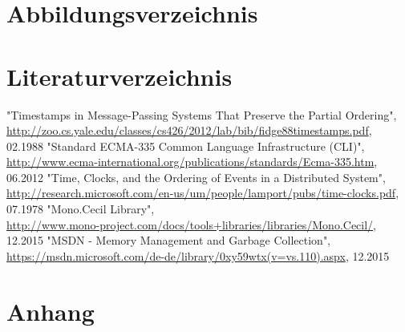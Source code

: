 \documentclass[10pt,a4paper]{article}
\begin{document}
\section*{Abbildungsverzeichnis}
\makeatletter
{}
\makeatother
\section*{Literaturverzeichnis}
\newcommand\oldsection{}
\let\oldsection=\section
\renewcommand{\section}[2]{}
\begin{thebibliography}{xxxxxxxxxxxxx}
"Timestamps in Message-Passing Systems That Preserve the Partial Ordering", \href{http://zoo.cs.yale.edu/classes/cs426/2012/lab/bib/fidge88timestamps.pdf}{http://zoo.cs.yale.edu/classes/cs426/2012/lab/bib/fidge88timestamps.pdf}, 02.1988
"Standard ECMA-335 Common Language Infrastructure (CLI)", \href{http://www.ecma-international.org/publications/standards/Ecma-335.htm}{http://www.ecma-international.org/publications/standards/Ecma-335.htm}, 06.2012
"Time, Clocks, and the Ordering of Events in a Distributed System", \href{http://research.microsoft.com/en-us/um/people/lamport/pubs/time-clocks.pdf}{http://research.microsoft.com/en-us/um/people/lamport/pubs/time-clocks.pdf}, 07.1978
"Mono.Cecil Library",\\ \href{http://www.mono-project.com/docs/tools+libraries/libraries/Mono.Cecil/}{http://www.mono-project.com/docs/tools+libraries/libraries/Mono.Cecil/}, 12.2015
"MSDN - Memory Management and Garbage Collection", \href{https://msdn.microsoft.com/de-de/library/0xy59wtx(v=vs.110).aspx}{https://msdn.microsoft.com/de-de/library/0xy59wtx(v=vs.110).aspx}, 12.2015
\end{thebibliography}
\let\section=\oldsection
\newpage
\section*{Anhang}
\end{document}
